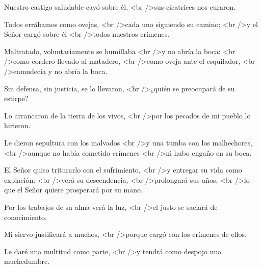 			\begin{readtalk}Nuestro castigo saludable cayó sobre él, <br />sus cicatrices nos curaron. \end{readtalk}
			
			\begin{readtalk}Todos errábamos como ovejas, <br />cada uno siguiendo su camino; <br />y el Señor cargó sobre él <br />todos nuestros crímenes. \end{readtalk}
			
			\begin{readtalk}Maltratado, voluntariamente se humillaba <br />y no abría la boca: <br />como cordero llevado al matadero, <br />como oveja ante el esquilador, <br />enmudecía y no abría la boca. \end{readtalk}
			
			\begin{readtalk}Sin defensa, sin justicia, se lo llevaron, <br />¿quién se preocupará de su estirpe? \end{readtalk}
			
			\begin{readtalk}Lo arrancaron de la tierra de los vivos, <br />por los pecados de mi pueblo lo hirieron. \end{readtalk}
			
			\begin{readtalk}Le dieron sepultura con los malvados <br />y una tumba con los malhechores, <br />aunque no había cometido crímenes <br />ni hubo engaño en su boca. \end{readtalk}
			
			\begin{readtalk}El Señor quiso triturarlo con el sufrimiento, <br />y entregar su vida como expiación: <br />verá su descendencia, <br />prolongará sus años, <br />lo que el Señor quiere prosperará por su mano. \end{readtalk}
			
			\begin{readtalk}Por los trabajos de su alma verá la luz, <br />el justo se saciará de conocimiento. \end{readtalk}
			
			\begin{readtalk}Mi siervo justificará a muchos, <br />porque cargó con los crímenes de ellos. \end{readtalk}
			
			\begin{readtalk}Le daré una multitud como parte, <br />y tendrá como despojo una muchedumbre. \end{readtalk}
			
